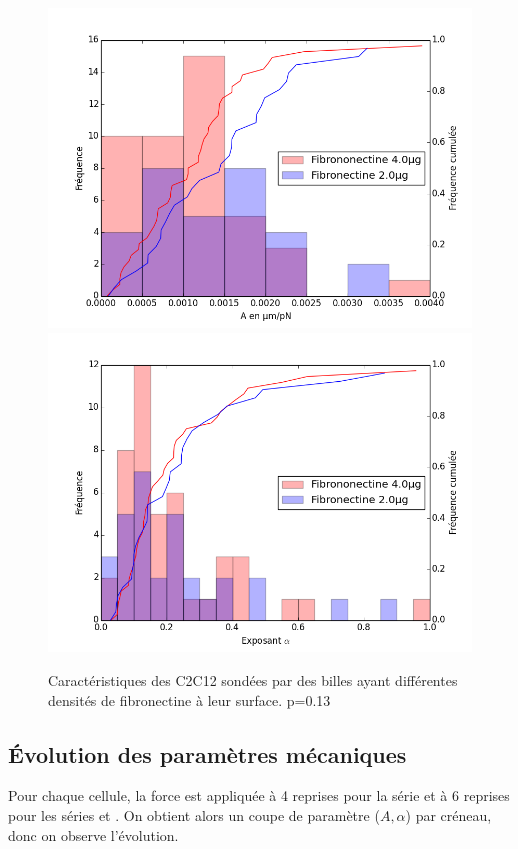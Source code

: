 \begin{figure}
\includegraphics[scale=0.5]{Figures/A_coating.png} 
\includegraphics[scale=0.5]{Figures/E_coating.png} 
\caption{Caractéristiques des C2C12 sondées par des billes ayant différentes densités de fibronectine à leur surface. p=0.13}
\end{figure}

\subsection{\'Evolution des paramètres mécaniques}

Pour chaque cellule, la force est appliquée à 4 reprises pour la série  et à 6 reprises pour les séries  et . On obtient alors un coupe de paramètre ($A,\alpha$) par créneau, donc on observe l'évolution. 

